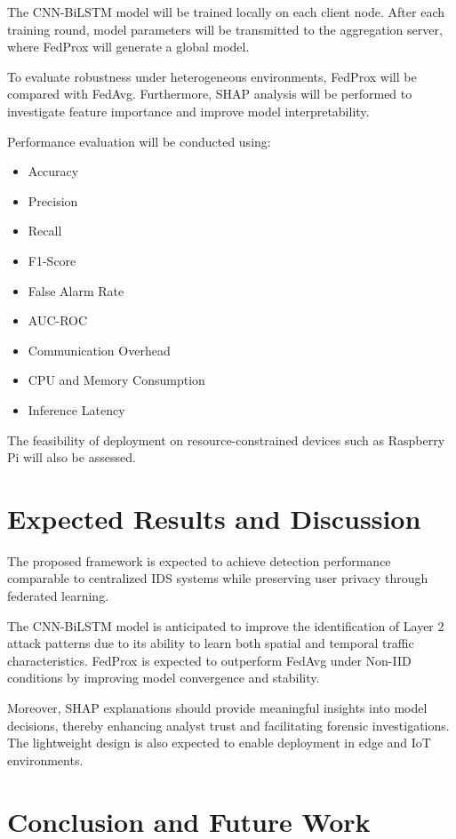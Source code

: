 \documentclass[conference]{IEEEtran}
\begin{document}
The CNN-BiLSTM model will be trained locally on each client node. After each training round, model parameters will be transmitted to the aggregation server, where FedProx will generate a global model.

To evaluate robustness under heterogeneous environments, FedProx will be compared with FedAvg. Furthermore, SHAP analysis will be performed to investigate feature importance and improve model interpretability.

Performance evaluation will be conducted using:

\begin{itemize}
\item Accuracy
\item Precision
\item Recall
\item F1-Score
\item False Alarm Rate
\item AUC-ROC
\item Communication Overhead
\item CPU and Memory Consumption
\item Inference Latency
\end{itemize}

The feasibility of deployment on resource-constrained devices such as Raspberry Pi will also be assessed.

\section{Expected Results and Discussion}

The proposed framework is expected to achieve detection performance comparable to centralized IDS systems while preserving user privacy through federated learning.

The CNN-BiLSTM model is anticipated to improve the identification of Layer 2 attack patterns due to its ability to learn both spatial and temporal traffic characteristics. FedProx is expected to outperform FedAvg under Non-IID conditions by improving model convergence and stability.

Moreover, SHAP explanations should provide meaningful insights into model decisions, thereby enhancing analyst trust and facilitating forensic investigations. The lightweight design is also expected to enable deployment in edge and IoT environments.

\section{Conclusion and Future Work}
\end{document}
